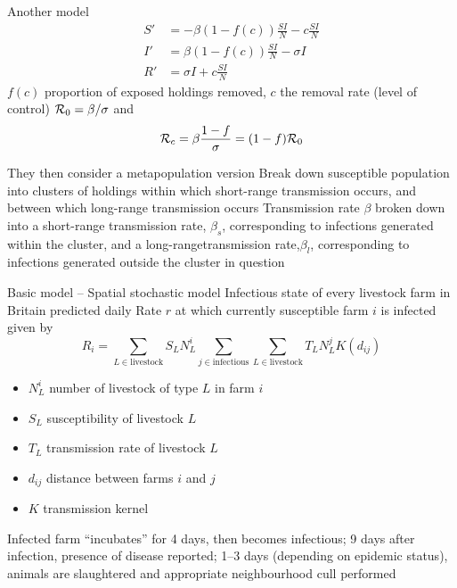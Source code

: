 \documentclass[aspectratio=43]{beamer}
\begin{document}
\begin{frame}{Another model}
	\begin{subequations}
		\begin{align}
			S' &= -\beta(1-f(c))\frac{SI}{N}-c\frac{SI}{N} \\
			I' &= \beta(1-f(c))\frac{SI}{N}-\sigma I \\
			R' &= \sigma I+c\frac{SI}{N}
		\end{align}
	\end{subequations}
	\vfill
	$f(c)$ proportion of exposed holdings removed, $c$ the removal rate (level of control)
	\vfill
	$\mathcal{R}_0=\beta/\sigma$ and 
	\[
		\mathcal{R}_c=\beta\frac{1-f}{\sigma}=(1-f)\mathcal{R}_0
	\]
\end{frame}

\begin{frame}{They then consider a metapopulation version}
	Break down susceptible population into clusters of holdings within which short-range transmission occurs, and between which long-range transmission occurs
	\vfill 
	Transmission rate $\beta$  broken  down into a short-range transmission rate, $\beta_s$, corresponding to infections generated within the cluster, and a long-rangetransmission  rate,$\beta_l$,  corresponding  to  infections  generated outside the cluster in question
\end{frame}


\begin{frame}{Basic model -- Spatial stochastic model}
	Infectious state of every livestock farm in Britain predicted daily 
	\vfill
	Rate $r$ at which currently susceptible farm $i$ is infected given by
	\[
		R_i = \sum_{L\in\text{livestock}}S_LN_L^i
		\sum_{j\in\text{infectious}}\sum_{L\in\text{livestock}} T_LN_L^jK(d_{ij})
	\]
	\begin{itemize}
		\item $N_L^i$ number of livestock of type $L$ in farm $i$
		\item $S_L$ susceptibility of livestock $L$
		\item $T_L$ transmission rate of livestock $L$
		\item $d_{ij}$ distance between farms $i$ and $j$
		\item $K$ transmission kernel
	\end{itemize}
	\vfill
	Infected farm ``incubates'' for 4 days, then becomes infectious; 9 days after infection, presence of disease reported; 1--3 days (depending on epidemic status), animals are slaughtered and appropriate neighbourhood cull performed
\end{frame}
\end{document}
